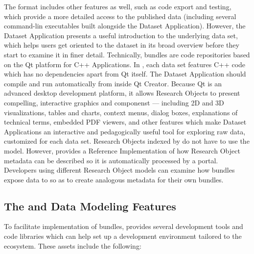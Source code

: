 \documentclass[11pt,letterpaper]{article}
\begin{document}
\p{}
The {\RAK} format includes other 
features as well, such as code export and testing, 
which provide a more detailed access to 
the published data (including several command-lin 
executables built alongside the Dataset Application).  
However, the Dataset Application 
presents a useful introduction to the underlying 
data set, which helps users get oriented to the dataset 
in its broad overview before they start to examine it in 
finer detail.
\p{}
Technically, {\MOSAIC} {\RAK} bundles are code repositories 
based on the Qt platform for C++ Applications.  
In {\RAK}, each data set features C++ code which has no 
dependencies apart from Qt itself.  The Dataset 
Application should compile and run automatically from 
inside Qt Creator.  Because Qt is an advanced 
desktop {\GUI} development platform, it allows 
Research Objects to present compelling, 
interactive graphics and {\GUI} componenst 
--- including 2D and 3D visualizations, tables and charts, 
context menus, dialog boxes, explanations of 
technical terms, embedded PDF viewers, and other 
features which make Dataset Applications an 
interactive and pedagogically useful tool for 
exploring raw data, customized for each data set.
\p{}  
Research Objects indexed by {\MOSAIC} do not have to 
use the {\RAK} model.  However, {\RAK} provides a 
Reference Implementation of how Research Object 
metadata can be described so it is automatically 
processed by a {\MOSAIC} portal.  Developers 
using different Research Object models can 
examine how {\RAK} bundles expose data to {\MOSAIC} 
so as to create analogous metadata for their own 
bundles.
\p{}
\subsection{The {\lMOSAIC} {\SDK} and Data Modeling Features}
To facilitate implementation of {\RAK} bundles, 
{\MOSAIC} provides several development tools and 
code libraries which can help set up a development 
environment tailored to the {\MOSAIC} ecosystem.  
These assets include the following: 
\end{document}
